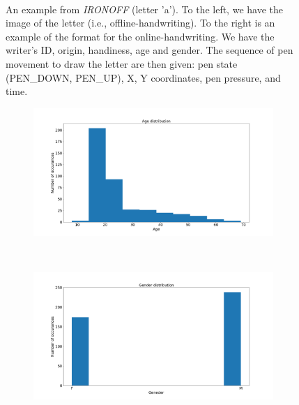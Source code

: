 \begin{figure}[!htbp]
\begin{subfigure}{0.45\textwidth}
    \end{subfigure}
    ~
    \caption{An example from \textit{IRONOFF} (letter 'a'). To the left, we have the image of the letter (i.e., offline-handwriting). To the right is an example of the format for the online-handwriting. We have the writer's ID, origin, handiness, age and gender. The sequence of pen movement to draw the letter are then given: pen state (PEN\_DOWN, PEN\_UP), X, Y coordinates, pen pressure, and time.}
    \label{fig:ironoff_example}
\end{figure}

\begin{figure}
    \centering
    \begin{subfigure}{0.45\textwidth}
        \includegraphics[scale=0.25]{images/dataset/age_dist.png}
    \end{subfigure}
    ~
    \begin{subfigure}{0.45\textwidth}
        \includegraphics[scale=0.25]{images/dataset/sex_dist.png}
    \end{subfigure}
    ~
    \begin{subfigure}{0.45\textwidth}

\end{subfigure}
\end{figure}
